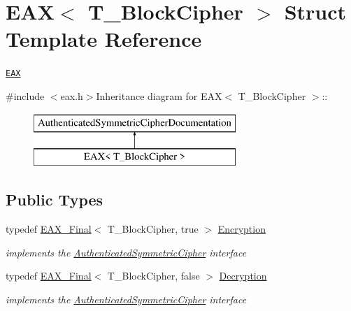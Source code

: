 \hypertarget{struct_e_a_x}{
\section{EAX$<$ T\_\-BlockCipher $>$ Struct Template Reference}
\label{struct_e_a_x}
}


\href{http://www.cryptolounge.org/wiki/EAX}{\tt EAX}  


{\ttfamily \#include $<$eax.h$>$}Inheritance diagram for EAX$<$ T\_\-BlockCipher $>$::\begin{figure}[H]
\begin{center}
\leavevmode
\includegraphics[height=2cm]{struct_e_a_x}
\end{center}
\end{figure}
\subsection*{Public Types}
\begin{DoxyCompactItemize}
\item 
\hypertarget{struct_e_a_x_a1b0b4cf4bd89058f9785afa01a9eb0f6}{
typedef \hyperlink{class_e_a_x___final}{EAX\_\-Final}$<$ T\_\-BlockCipher, true $>$ \hyperlink{struct_e_a_x_a1b0b4cf4bd89058f9785afa01a9eb0f6}{Encryption}}
\label{struct_e_a_x_a1b0b4cf4bd89058f9785afa01a9eb0f6}

\begin{DoxyCompactList}\small\item\em implements the \hyperlink{class_authenticated_symmetric_cipher}{AuthenticatedSymmetricCipher} interface \item\end{DoxyCompactList}\item 
\hypertarget{struct_e_a_x_afbe0bdad373e3999f563505943f939fb}{
typedef \hyperlink{class_e_a_x___final}{EAX\_\-Final}$<$ T\_\-BlockCipher, false $>$ \hyperlink{struct_e_a_x_afbe0bdad373e3999f563505943f939fb}{Decryption}}
\label{struct_e_a_x_afbe0bdad373e3999f563505943f939fb}

\begin{DoxyCompactList}\small\item\em implements the \hyperlink{class_authenticated_symmetric_cipher}{AuthenticatedSymmetricCipher} interface \item\end{DoxyCompactList}\end{DoxyCompactItemize}


